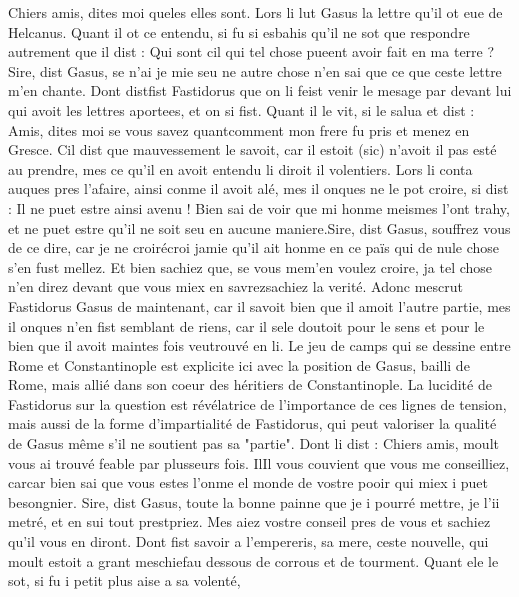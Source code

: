\documentclass{article}
\begin{document}
\begin{pages}
   Chiers amis, dites moi queles elles sont.
   Lors li lut Gasus la lettre qu’il ot eue de Helcanus. 
   Quant il ot ce entendu, si fu si esbahis qu’il ne sot que respondre autrement que il dist :
   Qui sont cil qui tel chose pueent avoir fait en ma terre ?Sire, dist Gasus, se n’ai je mie seu ne autre chose n’en sai 
      que ce que ceste lettre m’en chante.
   Dont distfist Fastidorus que 
   on li feist venir 
      le mesage par devant lui 
      qui avoit les lettres aportees, et on si fist. 
   Quant il le vit, si le salua et dist :
   Amis, dites moi se vous savez quantcomment 
      mon frere fu pris et menez en Gresce.
   Cil dist que mauvessement le savoit, car 
      il estoit (sic) 
      n’avoit il pas esté au prendre, mes ce qu’il en avoit entendu li diroit il volentiers. 
   Lors li conta auques pres l’afaire, ainsi conme il avoit alé, 
   mes il onques ne le pot croire, si dist :
   Il ne puet estre ainsi avenu ! 
      Bien sai de voir que mi honme meismes l’ont trahy, et ne puet estre qu’il ne soit seu en aucune maniere.Sire, dist Gasus, souffrez vous de ce dire, 
      car je ne croirécroi 
      jamie qu’il ait honme en ce païs qui de nule chose s’en fust mellez. 
      Et bien sachiez que, se vous mem'en voulez croire, 
      ja tel chose n’en direz devant que vous miex en savrezsachiez la verité.
   Adonc mescrut Fastidorus Gasus de maintenant, 
   car il savoit bien que il amoit l’autre partie, mes il onques n’en fist semblant de riens, car il 
   sele doutoit pour le sens 
   et pour le bien que il avoit maintes fois veutrouvé en li. 
   Le jeu de camps qui se dessine entre Rome et Constantinople est explicite ici avec la position de Gasus, 
   bailli de Rome, mais allié dans son coeur des héritiers de Constantinople. La lucidité de Fastidorus sur la question est révélatrice
   de l'importance de ces lignes de tension, mais aussi de la forme d'impartialité de Fastidorus, qui peut valoriser la qualité de Gasus
   même s'il ne soutient pas sa "partie".
   Dont li dist :
   Chiers amis, moult vous ai trouvé feable par plusseurs fois. 
      IlIl vous couvient que vous me conseilliez, 
      carcar bien sai que vous estes l’onme el monde de vostre pooir 
      qui miex i puet besongnier. \pend
\pstart Sire, dist Gasus, 
   toute la bonne painne que je i pourré mettre, je l'ii metré, et en sui tout 
   prestpriez. 
   Mes aiez vostre conseil pres de vous et sachiez qu’il vous en diront.
   Dont fist savoir a l’empereris, sa mere, ceste nouvelle, 
   qui moult estoit a grant meschiefau dessous de corrous et de tourment. 
   Quant ele le sot, si fu i petit plus aise a sa volenté, 

\end{pages}
\end{document}
